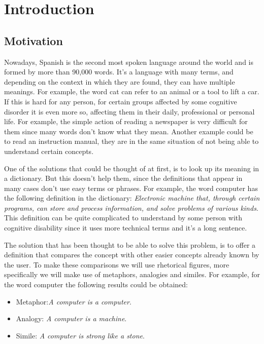 \chapter{Introduction}
\label{cap:introduction}

\section{Motivation}
\label{sec:motivation}

Nowadays, Spanish is the second most spoken language around the world and is formed by more than 90,000 words.
It's a language with many terms, and depending on the context in which they are found, they can have multiple meanings. For example, the word cat can refer to an animal or a tool to lift a car. If this is hard for any person, for certain groups affected by some cognitive disorder it is even more so, affecting them in their daily, professional or personal life. For example, the simple action of reading a newspaper is very difficult for them since many words don't know what they mean. Another example could be to read an instruction manual, they are in the same situation of not being able to understand certain concepts.


One of the solutions that could be thought of at first, is to look up its meaning in a dictionary. But this doesn't help them, since the definitions that appear in many cases don't use easy terms or phrases. For example, the word computer has the following definition in the dictionary: \textit{Electronic machine that, through certain programs, can store and process information, and solve problems of various kinds}. This definition can be quite complicated to understand by some person with cognitive disability since it uses more technical terms and it's a long sentence.


The solution that has been thought to be able to solve this problem, is to offer a definition that compares the concept with other easier concepts already known by the user. To make these comparisons we will use rhetorical figures, more specifically we will make use of metaphors, analogies and similes.
For example, for the word computer the following results could be obtained:

\begin{itemize}
	\item Metaphor:\textit{A computer is a computer}.
	\item Analogy: \textit{A computer is a machine}.
	\item Simile: \textit{A computer is strong like a stone}.
\end{itemize}

